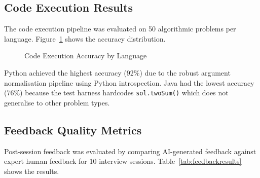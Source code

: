 \subsection{Code Execution Results}

The code execution pipeline was evaluated on 50 algorithmic problems per language. Figure~\ref{fig:codeaccuracy} shows the accuracy distribution.

\begin{figure}[H]
\centering
{}
\caption{Code Execution Accuracy by Language}
\label{fig:codeaccuracy}
\end{figure}

Python achieved the highest accuracy (92\%) due to the robust argument normalisation pipeline using Python introspection. Java had the lowest accuracy (76\%) because the test harness hardcodes \texttt{sol.twoSum()} which does not generalise to other problem types.

\subsection{Feedback Quality Metrics}

Post-session feedback was evaluated by comparing AI-generated feedback against expert human feedback for 10 interview sessions. Table~\ref{tab:feedbackresults} shows the results.

